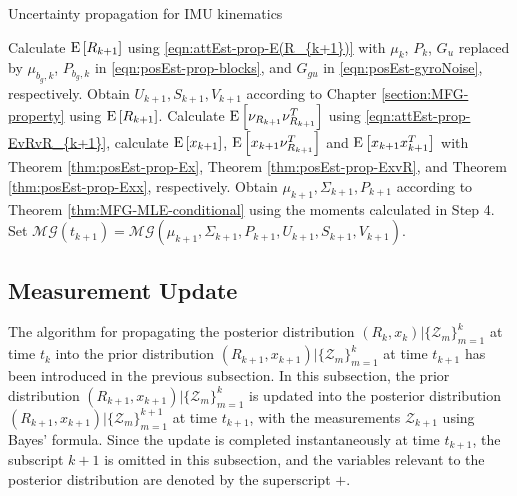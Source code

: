 \begin{table}
	\caption{Uncertainty propagation for IMU kinematics}
	\label{tab:posEst-prop}
	\begin{algorithmic}[1]
		\algrule[0.8pt]
		\algrule
		\State Calculate $\mathrm{E}\left[ R_{k+1} \right]$ using \eqref{eqn:attEst-prop-E(R_{k+1})} with $\mu_k$, $P_k$, $G_u$ replaced by $\mu_{b_g,k}$, $P_{b_g,k}$ in \eqref{eqn:posEst-prop-blocks}, and $G_{gu}$ in \eqref{eqn:posEst-gyroNoise}, respectively.
		\State Obtain $U_{k+1},S_{k+1},V_{k+1}$ according to Chapter \ref{section:MFG-property} using $\mathrm{E}\left[ R_{k+1} \right]$.
		\State Calculate $\mathrm{E}\left[ \nu_{R_{k+1}}\nu_{R_{k+1}}^T \right]$ using \eqref{eqn:attEst-prop-EvRvR_{k+1}}, calculate $\mathrm{E}\left[ x_{k+1} \right]$, $\mathrm{E}\left[ x_{k+1}\nu_{R_{k+1}}^T \right]$ and $\mathrm{E}\left[ x_{k+1}x_{k+1}^T \right]$ with Theorem \ref{thm:posEst-prop-Ex}, Theorem \ref{thm:posEst-prop-ExvR}, and Theorem \ref{thm:posEst-prop-Exx}, respectively.
		\State Obtain $\mu_{k+1},\Sigma_{k+1},P_{k+1}$ according to Theorem \ref{thm:MFG-MLE-conditional} using the moments calculated in Step 4.
		\State Set $\mathcal{MG}(t_{k+1}) = \mathcal{MG}(\mu_{k+1},\Sigma_{k+1},P_{k+1},U_{k+1},S_{k+1},V_{k+1})$.
		\EndProcedure
		\algrule[0.8pt]
	\end{algorithmic}
\end{table}

\subsection{Measurement Update}

The algorithm for propagating the posterior distribution $(R_k,x_k) | \{\mathcal{Z}_{m}\}_{m=1}^k$ at time $t_k$ into the prior distribution $(R_{k+1},x_{k+1}) | \{\mathcal{Z}_{m}\}_{m=1}^k$ at time $t_{k+1}$ has been introduced in the previous subsection.
In this subsection, the prior distribution $(R_{k+1},x_{k+1}) | \{\mathcal{Z}_{m}\}_{m=1}^k$ is updated into the posterior distribution $(R_{k+1},x_{k+1}) | \{\mathcal{Z}_{m}\}_{m=1}^{k+1}$ at time $t_{k+1}$, with the measurements $\mathcal{Z}_{k+1}$ using Bayes' formula.
Since the update is completed instantaneously at time $t_{k+1}$, the subscript $k+1$ is omitted in this subsection, and the variables relevant to the posterior distribution are denoted by the superscript $+$.

